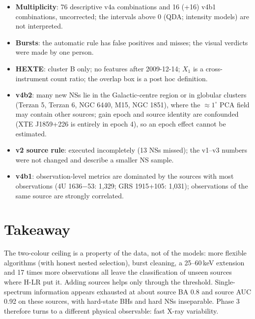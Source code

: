 \begin{itemize}
the nested selection; the nested source AUC is an approximation (shifted scores).
\item \textbf{Multiplicity}: 76 descriptive v4a combinations and 16 (+16) v4b1 combinations, uncorrected; the intervals above
0 (QDA; intensity models) are not interpreted.
\item \textbf{Bursts}: the automatic rule has false positives and misses; the visual verdicts were made by one person.
\item \textbf{HEXTE}: cluster B only; no features after 2009-12-14; $X_1$ is a cross-instrument count ratio; the overlap box is
a post hoc definition.
\item \textbf{v4b2}: many new NSs lie in the Galactic-centre region or in globular clusters (Terzan 5, Terzan 6, NGC 6440,
M15, NGC 1851), where the $\approx1^\circ$ PCA field may contain other sources; gain epoch and source identity are
confounded (XTE J1859+226 is entirely in epoch 4), so an epoch effect cannot be estimated.
\item \textbf{v2 source rule}: executed incompletely (13 NSs missed); the v1--v3 numbers were not changed and describe a
smaller NS sample.
\item \textbf{v4b1}: observation-level metrics are dominated by the sources with most observations (4U 1636$-$53: 1,329;
GRS 1915+105: 1,031); observations of the same source are strongly correlated.
\end{itemize}

\section{Takeaway}
The two-colour ceiling is a property of the data, not of the models: more flexible algorithms (with honest nested
selection), burst cleaning, a 25--60\,keV extension and 17 times more observations all leave the classification of unseen
sources where H-LR put it. Adding sources helps only through the threshold. Single-spectrum information appears
exhausted at about source BA 0.8 and source AUC 0.92 on these sources, with hard-state BHs and hard NSs inseparable.
Phase 3 therefore turns to a different physical observable: fast X-ray variability.
